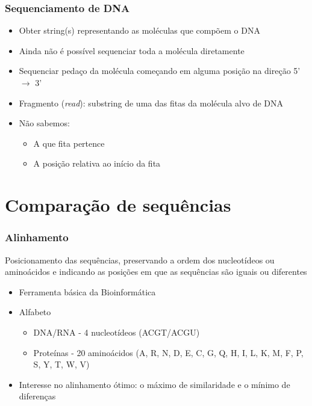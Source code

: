 \documentclass{beamer}
\begin{document}
		\begin{frame}\frametitle{Sequenciamento de DNA}
			\begin{itemize}
				\item Obter string(s) representando as moléculas que compõem o DNA
				\item Ainda não é possível sequenciar toda a molécula diretamente
				\item Sequenciar pedaço da molécula começando em alguma posição	na direção 5' $\rightarrow$ 3'
				\item Fragmento (\textit{read}): substring de uma das fitas da molécula alvo
				de DNA
				\item Não sabemos:
				\begin{itemize}
					\item A que fita pertence
					\item A posição relativa ao início da fita
				\end{itemize}
			\end{itemize}
		\end{frame}
		
	\section{Comparação de sequências}
		\begin{frame}\frametitle{Alinhamento}
			Posicionamento das sequências, preservando a ordem dos nucleotídeos ou aminoácidos e indicando as posições em que as sequências são iguais ou diferentes
			\begin{itemize}
				\item Ferramenta básica da Bioinformática
				\item Alfabeto
				\begin{itemize}
					\item DNA/RNA - 4 nucleotídeos (ACGT/ACGU)
					\item Proteínas - 20 aminoácidos (A, R, N, D, E, C, G, Q, H, I, L, K, M, F, P, S, Y, T, W, V)
				\end{itemize}
				\item Interesse no alinhamento ótimo: o máximo de similaridade e o mínimo de diferenças			
			\end{itemize}
		\end{frame}
	
\end{document}
